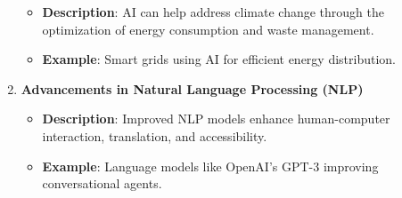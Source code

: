 \documentclass[aspectratio=169]{beamer}
\begin{document}
\begin{frame}[fragile]
\begin{enumerate}
            \begin{itemize}
                \item \textbf{Description}: AI can help address climate change through the optimization of energy consumption and waste management.
                \item \textbf{Example}: Smart grids using AI for efficient energy distribution.
            \end{itemize}
        \item \textbf{Advancements in Natural Language Processing (NLP)}
            \begin{itemize}
                \item \textbf{Description}: Improved NLP models enhance human-computer interaction, translation, and accessibility.
                \item \textbf{Example}: Language models like OpenAI's GPT-3 improving conversational agents.
            \end{itemize}
    \end{enumerate}
\end{frame}
\end{document}
